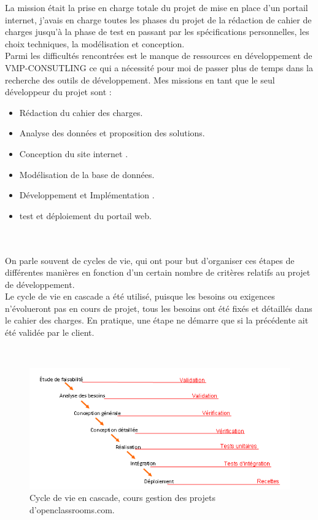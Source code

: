 \documentclass[12pt]{article}
\begin{document}
La mission était la prise en charge totale du projet de mise en place d'un portail internet,
j'avais en charge toutes les phases du projet de la rédaction de cahier de charges jusqu'à la phase de test en 
passant par les spécifications personnelles, les choix techniques, la modélisation et conception.\\
Parmi les difficultés rencontrées est le manque de ressources en développement de VMP-CONSUTLING ce qui a nécessité pour moi 
de passer plus de temps dans la recherche des outils de développement.
Mes missions en tant que le seul développeur du projet sont : \\
\begin{itemize}
\item Rédaction  du cahier des charges.
\item Analyse des données et proposition des solutions.
\item Conception  du site internet .  
\item Modélisation de la base de données.
\item Développement et Implémentation .
\item test et déploiement du portail web.
\end{itemize}
\\ \\
On parle souvent de cycles de vie, qui ont pour but d’organiser ces étapes de différentes manières en fonction d’un certain nombre de critères relatifs au projet de développement.\\
Le cycle de vie en cascade a été utilisé, puisque 
les besoins ou exigences n’évolueront pas en cours de projet, 
tous les besoins ont été fixés et détaillés dans le cahier des charges.
En pratique, une étape ne démarre que si la précédente ait été validée par le client.

\\
\begin{center}
\begin{figure}[htp]
  \centering
  \includegraphics[width=12cm]{p.png}
  \caption{Cycle de vie en cascade, cours gestion des projets d'openclassrooms.com.}
  \label{fig:une-autre-image}
\end{figure}
 
\end{center}
\\ \\
\end{document}
